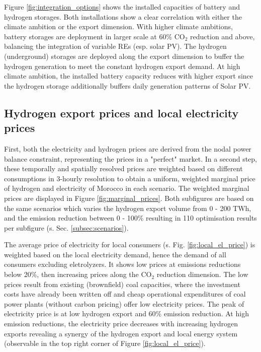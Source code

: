Figure \ref{fig:integration_options} shows the installed capacities of battery and hydrogen storages. Both installations show a clear correlation with either the climate ambition or the export dimension. With higher climate ambitions, battery storages are deployment in larger scale at 60\% $\mathrm{CO_2}$ reduction and above, balancing the integration of variable REs (esp. solar PV). The hydrogen (underground) storages are deployed along the export dimension to buffer the hydrogen generation to meet the constant hydrogen export demand. At high climate ambition, the installed battery capacity reduces with higher export since the hydrogen storage additionally buffers daily generation patterns of Solar PV.

\subsection{Hydrogen export prices and local electricity prices}
\label{subsec:results_prices}
First, both the electricity and hydrogen prices are derived from the nodal power balance constraint, representing the prices in a "perfect" market. %
In a second step, these temporally and spatially resolved prices are weighted based on different consumptions in 3-hourly resolution to obtain a uniform, weighted marginal price of hydrogen and electricity of Morocco in each scenario. The weighted marginal prices are displayed in Figure \ref{fig:marginal_prices}. Both subfigures are based on the same scenarios which varies the hydrogen export volume from 0 - 200 TWh, and the emission reduction between 0 - 100\% resulting in 110 optimisation results per subfigure (s. Sec. \ref{subsec:scenarios}).

The average price of electricity for local consumers (s. Fig. \ref{fig:local_el_price}) is weighted based on the local electricity demand, hence the demand of all consumers excluding eletrolyzers. It shows low prices at emissions reductions below 20\%, then increasing prices along the $\mathrm{CO_2}$ reduction dimension. The low prices result from existing (brownfield) coal capacities, where the investment costs have already been written off and cheap operational expenditures of coal power plants (without carbon pricing) offer low electricity prices. The peak of electricity price is at low hydrogen export and 60\% emission reduction. At high emission reductions, the electricity price decreases with increasing hydrogen exports revealing a synergy of the hydrogen export and local energy system (observable in the top right corner of Figure \ref{fig:local_el_price}).

